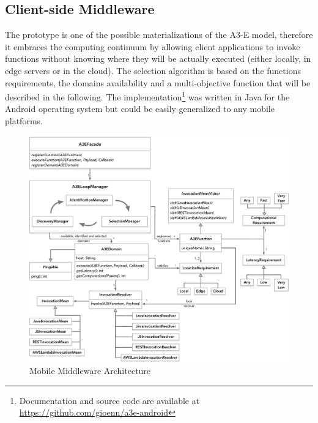 \subsection{Client-side Middleware}

The prototype is one of the possible materializations of the A3-E model, therefore it embraces the computing continuum by allowing client applications to invoke functions without knowing where they will be actually executed (either locally, in edge servers or in the cloud). The selection algorithm is based on the functions requirements, the domains availability and a multi-objective function that will be described in the following. The implementation\footnote{Documentation and source code are available at \url{https://github.com/gioenn/a3e-android}} was written in Java for the Android operating system but could be easily generalized to any mobile platforms. 
\begin{figure}[tbp]
	\includegraphics[width=1\textwidth]{figs/a3e-mobile-prototype}
	\caption{Mobile Middleware Architecture}
	\label{fig:mobile-prototype}
\end{figure}

